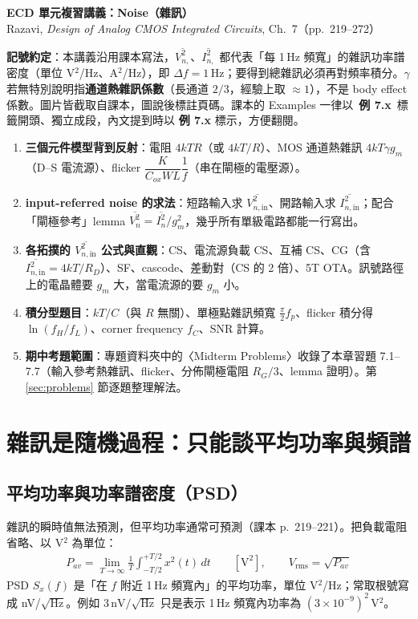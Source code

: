 \documentclass[11pt,a4paper]{article}
\newcommand{\Vsq}[1]{\overline{V^2_{n,\text{#1}}}}
\newcommand{\Isq}[1]{\overline{I^2_{n,\text{#1}}}}
\newcommand{\extag}[1]{\colorbox{extagbg}{\textcolor{extag}{\sffamily\bfseries\,例 #1\,}}}
\newcommand{\exref}[1]{\textcolor{extag}{\textbf{\sffamily 例 #1}}}
\begin{document}
\begin{center}{\LARGE\bfseries\sffamily ECD 單元複習講義：Noise（雜訊）}\\[0.3em]{\large Razavi, \emph{Design of Analog CMOS Integrated Circuits}, Ch.~7（pp.~219--272）}\end{center}

\textbf{記號約定}：本講義沿用課本寫法，$\Vsq{}$、$\Isq{}$ 都代表「每 1\,Hz 頻寬」的雜訊功率譜密度（單位 V$^2$/Hz、A$^2$/Hz），即 $\Delta f=1$\,Hz；要得到總雜訊必須再對頻率積分。$\gamma$ 若無特別說明指\textbf{通道熱雜訊係數}（長通道 $2/3$，經驗上取 $\approx1$），不是 body effect 係數。圖片皆截取自課本，圖說後標註頁碼。課本的 Examples 一律以 \extag{7.x} 標籤開頭、獨立成段，內文提到時以 \exref{7.x} 標示，方便翻閱。

\begin{takeaway}[考試重點地圖]
\begin{enumerate}[leftmargin=2.2em]
  \item \textbf{三個元件模型背到反射}：電阻 $4kTR$（或 $4kT/R$）、MOS 通道熱雜訊 $4kT\gamma g_m$（D–S 電流源）、flicker $\dfrac{K}{C_{ox}WL}\dfrac1f$（串在閘極的電壓源）。
  \item \textbf{input-referred noise 的求法}：短路輸入求 $\Vsq{in}$、開路輸入求 $\Isq{in}$；配合「閘極參考」lemma $\overline{V_n^2}=\overline{I_n^2}/g_m^2$，幾乎所有單級電路都能一行寫出。
  \item \textbf{各拓撲的 $\Vsq{in}$ 公式與直觀}：CS、電流源負載 CS、互補 CS、CG（含 $\Isq{in}=4kT/R_D$）、SF、cascode、差動對（CS 的 2 倍）、5T OTA。訊號路徑上的電晶體要 $g_m$ 大，當電流源的要 $g_m$ 小。
  \item \textbf{積分型題目}：$kT/C$（與 $R$ 無關）、單極點雜訊頻寬 $\frac{\pi}{2}f_p$、flicker 積分得 $\ln(f_H/f_L)$、corner frequency $f_C$、SNR 計算。
  \item \textbf{期中考題範圍}：專題資料夾中的〈Midterm Problems〉收錄了本章習題 7.1--7.7（輸入參考熱雜訊、flicker、分佈閘極電阻 $R_G/3$、lemma 證明）。第 \ref{sec:problems} 節逐題整理解法。
\end{enumerate}
\end{takeaway}

\section{雜訊是隨機過程：只能談平均功率與頻譜}

\subsection{平均功率與功率譜密度（PSD）}
雜訊的瞬時值無法預測，但平均功率通常可預測（課本 p.~219--221）。把負載電阻省略、以 V$^2$ 為單位：
\begin{align}
P_{av}=\lim_{T\to\infty}\frac1T\int_{-T/2}^{+T/2}x^2(t)\,dt\qquad[\text{V}^2],\qquad V_{\text{rms}}=\sqrt{P_{av}}
\end{align}
PSD $S_x(f)$ 是「在 $f$ 附近 1\,Hz 頻寬內」的平均功率，單位 V$^2$/Hz；常取根號寫成 nV/$\sqrt{\text{Hz}}$。例如 $3\,\text{nV}/\sqrt{\text{Hz}}$ 只是表示 1\,Hz 頻寬內功率為 $(3\times10^{-9})^2$\,V$^2$。
\end{document}
